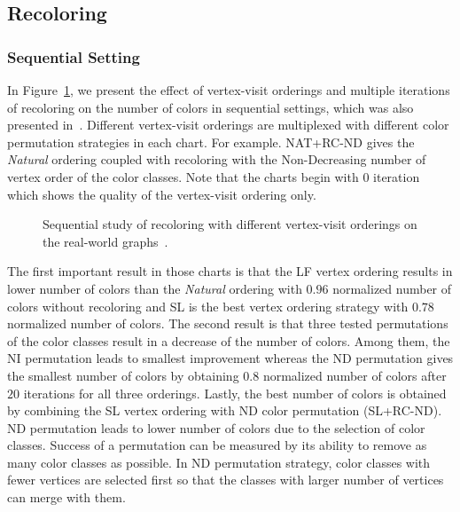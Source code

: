 \documentclass{article}
\begin{document}
\subsection{Recoloring}
\label{subsec:recoloring}

\subsubsection{Sequential Setting}
\label{subsubsec:seq}

In Figure~\ref{fig:seq_study}, we present the effect of vertex-visit orderings and
multiple iterations of recoloring on the number of colors in sequential settings, which
was also presented in~\cite{HiPC11}. Different vertex-visit orderings are multiplexed
with different color permutation strategies in each chart. For example. NAT+RC-ND gives
the {\em Natural} ordering coupled with recoloring with the Non-Decreasing number of
vertex order of the color classes. Note that the charts begin with
0 iteration which shows the quality of the vertex-visit ordering only.

\begin{figure}[bt]
  \centering
  \caption{Sequential study of recoloring with different vertex-visit orderings on the real-world graphs~\cite{HiPC11}.}
  \label{fig:seq_study}
\end{figure}


The first important result in those charts is that the LF vertex ordering results in
lower number of colors than the {\em Natural} ordering with $0.96$ normalized number of
colors without recoloring and SL is the best vertex ordering strategy with $0.78$ normalized
number of colors. The second result is that three tested permutations of the color
classes result in a decrease of the number of colors. Among them, the NI permutation
leads to smallest improvement whereas the ND permutation gives the smallest number of colors
by obtaining $0.8$ normalized number of colors after $20$ iterations for all three orderings.
Lastly, the best number of colors is obtained by combining the SL vertex ordering with
ND color permutation (SL+RC-ND). ND permutation leads to lower number of colors due to
the selection of color classes. Success of a permutation can be measured by its ability to
remove as many color classes as possible. In ND permutation strategy, color classes with
fewer vertices are selected first so that the classes with larger number of vertices 
can merge with them. 
\end{document}
